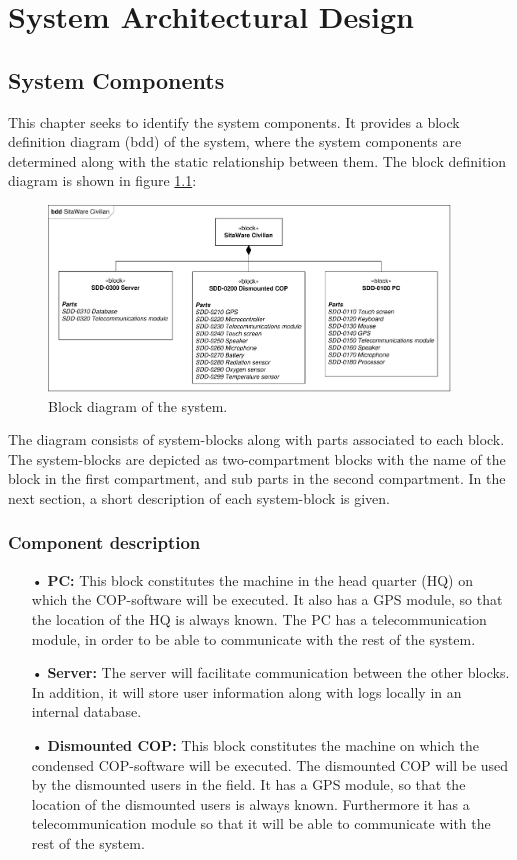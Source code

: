 \chapter{System Architectural Design}

\section{System Components}



This chapter seeks to identify the system components. It provides a block definition diagram (bdd) of the system, where the system components are determined along with the static relationship between them. The block definition diagram is shown in figure \ref{fig:block_diagram}:

\begin{figure}[H]
\centering
\includegraphics[width=0.95\textwidth]
{billeder/bdd_overordnet.pdf}
\caption{Block diagram of the system.}
\label{fig:block_diagram}
\end{figure}

The diagram consists of system-blocks along with parts associated to each block. The system-blocks are depicted as two-compartment blocks with the name of the block in the first compartment, and sub parts in the second compartment. In the next section, a short description of each system-block is given.

\subsection{Component description}
\begin{enumerate}
\item[•] \textbf{PC:} This block constitutes the machine in the head quarter (HQ) on which the COP-software will be executed. It also has a GPS module, so that the location of the HQ is always known. The PC has a telecommunication module, in order to be able to communicate with the rest of the system.
\item[•] \textbf{Server:} The server will facilitate communication between the other blocks. In addition, it will store user information along with logs locally in an internal database.
\item[•] \textbf{Dismounted COP:} This block constitutes the machine on which the condensed COP-software will be executed. The dismounted COP will be used by the dismounted users in the field. It has a GPS module, so that the location of the dismounted users is always known. Furthermore it has a telecommunication module so that it will be able to communicate with the rest of the system. 
\end{enumerate}
